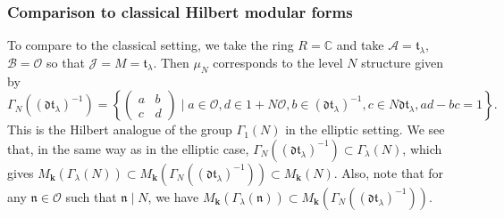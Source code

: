 \documentclass[a4paper,oneside]{amsart}
\theoremstyle{plain}
\theoremstyle{definition}
\begin{document}
\subsubsection{Comparison to classical Hilbert modular forms}
To compare to the classical setting, we take the ring $R=\mathbb{C}$ and take $\mathcal{A}=\mathfrak{t}_\lambda$, $\mathcal{B}= \mathcal{O}$ so that $\mathcal{J}=M=\mathfrak{t}_\lambda$. Then $\mu_N$ corresponds to the level $N$ structure given by
\begin{equation*}
    \Gamma_N((\mathfrak{dt}_{\lambda})^{-1}) = \left\{ \left(\begin{smallmatrix} a & b \\ c & d \end{smallmatrix}\right) \mid a \in \mathcal{O}, d \in 1 + N\mathcal{O}, b \in (\mathfrak{dt}_{\lambda})^{-1}, c \in N\mathfrak{dt}_\lambda, ad-bc=1\right\}.
\end{equation*}
This is the Hilbert analogue of the group $\Gamma_1(N)$ in the elliptic setting. We see that, in the same way as in the elliptic case, $\Gamma_N((\mathfrak{dt}_{\lambda})^{-1}) \subset \Gamma_\lambda(N)$, which gives $M_{\textbf{k}}(\Gamma_\lambda(N)) \subset M_{\textbf{k}}(\Gamma_N((\mathfrak{dt}_{\lambda})^{-1})) \subset M_\textbf{k}(N)$. Also, note that for any $\mathfrak{n} \in \mathcal{O}$ such that $\mathfrak{n} \mid N$, we have $M_{\textbf{k}}(\Gamma_\lambda(\mathfrak{n})) \subset M_{\textbf{k}}(\Gamma_N((\mathfrak{dt}_{\lambda})^{-1}))$.
\end{document}
